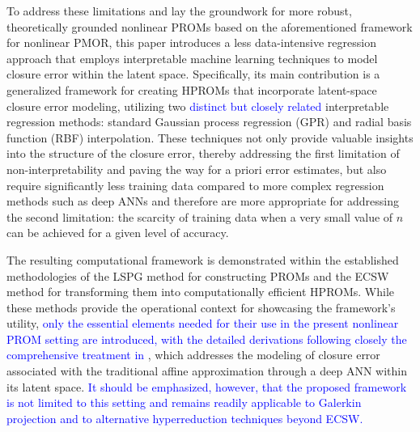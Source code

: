 \documentclass[preprint,10pt]{elsarticle}
\begin{document}
To address these limitations and lay the groundwork for more robust, theoretically grounded nonlinear PROMs based on the aforementioned framework for nonlinear PMOR, this paper 
introduces a less data-intensive regression approach that employs interpretable machine learning techniques to model closure error within the latent space. Specifically, its main 
contribution is a generalized framework for creating HPROMs that incorporate latent-space closure error modeling, utilizing two \textcolor{blue}{distinct but closely related} interpretable regression methods: standard 
Gaussian process regression (GPR) and radial basis function (RBF) interpolation. These techniques not only provide valuable insights into the structure of the closure error,
thereby addressing the first limitation of non-interpretability and paving the way for a priori error estimates, but also require significantly less training data compared to more 
complex regression methods such as deep ANNs and therefore are more appropriate for addressing the second limitation: the scarcity of training data when a very small value of $n$ can 
be achieved for a given level of accuracy. 

The resulting computational framework is demonstrated within the established methodologies of the LSPG method for constructing PROMs and the ECSW method for transforming them into computationally efficient HPROMs. While these methods provide the operational context for showcasing the framework's utility, \textcolor{blue}{only the essential elements needed for their use in the present nonlinear PROM setting are introduced, with the detailed derivations following closely the comprehensive treatment in \cite{barnett2023neural}}, which addresses the modeling of closure error associated with the traditional affine approximation through a deep ANN within its latent space. \textcolor{blue}{It should be emphasized, however, that the proposed framework is not limited to this setting and remains readily applicable to Galerkin projection and to alternative hyperreduction techniques beyond ECSW.}
\end{document}
